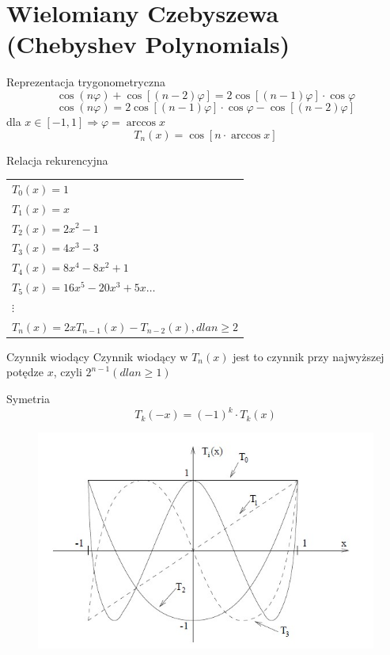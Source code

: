 \section{Wielomiany Czebyszewa (Chebyshev Polynomials)}
\begin{frame}{Reprezentacja trygonometryczna}
	$$\cos(n\varphi)+\cos[(n-2)\varphi] = 2\cos[(n-1)\varphi] \cdot \cos \varphi$$
    $$\cos(n\varphi) = 2\cos[(n-1)\varphi] \cdot \cos \varphi - \cos[(n-2)\varphi]$$
    dla $x \in [-1,1]\Rightarrow \varphi=\arccos x$
    $$T_n(x) = \cos[n \cdot \arccos x]$$
\end{frame}
\begin{frame}{Relacja rekurencyjna}
	\begin{tabular}{l}
		$T_0(x) = 1$ \\
        $T_1(x) = x$ \\
        $T_2(x) = 2x^2-1$ \\
        $T_3(x) = 4x^3-3$ \\
        $T_4(x) = 8x^4-8x^2+1$ \\
        $T_5(x) = 16x^5-20x^3+5x\ldots$ \\
        $\vdots$ \\
        $T_n(x) = 2xT_{n-1}(x) - T_{n-2}(x), dla n\geqslant2$
	\end{tabular}
    
    \begin{block}{Czynnik wiodący}
    	Czynnik wiodący w $T_n(x)$ jest to czynnik przy najwyższej potędze $x$, czyli $2^{n-1} (dla n\geqslant1)$
    \end{block}
\end{frame}
\begin{frame}{Symetria}
	$$T_k(-x)=(-1)^k \cdot T_k(x)$$
    \begin{figure}
		\includegraphics[height=0.75\textheight]{img/5/symetria.jpg}
	\end{figure}
\end{frame}
